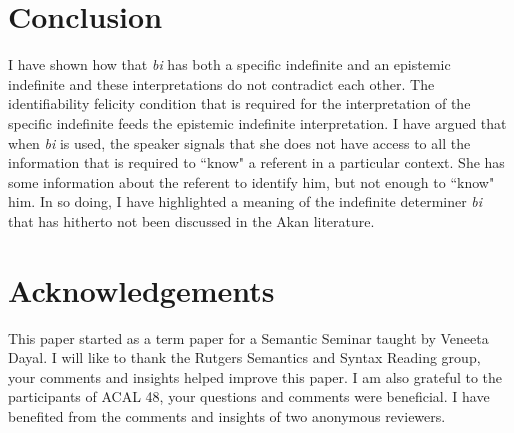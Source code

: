 \documentclass[output=paper,modfonts,nonflat,draftmode]{langsci/langscibook}
\begin{document}
\section{Conclusion}\label{sec:owusu:5}

I have shown how that \emph{bi} has both a  specific indefinite and an epistemic indefinite and these interpretations do not contradict each other. The identifiability felicity condition that is required for the interpretation of the specific indefinite feeds the epistemic indefinite interpretation. I have argued that when \emph{bi} is used, the speaker signals that she does not have access to all the information that is required to ``know" a referent in a particular context. She has some information about the referent to identify him, but not enough to ``know" him. In so doing, I have highlighted a meaning of the indefinite determiner \emph{bi} that has hitherto not been discussed in the Akan literature. 



\section*{Acknowledgements}
This paper started as a term paper for a Semantic Seminar taught by Veneeta Dayal. I will like to thank the Rutgers Semantics and Syntax Reading group, your comments and insights helped improve this paper. I am also grateful to the participants of  ACAL 48, your questions and comments were beneficial. I have benefited from the comments and insights of two anonymous reviewers. 
\end{document}
